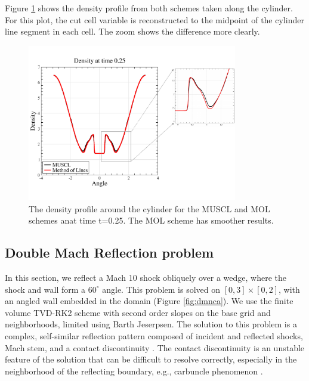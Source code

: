 Figure \ref{fig:cylbndry}
shows the density profile from both schemes
taken along the cylinder.
For this plot, the cut cell variable is
reconstructed to the midpoint of the cylinder line segment in each  cell.  
The zoom shows the difference more
clearly.

\begin{figure}
\begin{center}
\hspace*{-.5in}
\includegraphics[height=2.7in]{figs/MM_densityBndry.pdf}
\hspace*{.3in}
\caption{\sf The density profile  around the cylinder for the MUSCL and MOL schemes anat time
t=0.25.  The MOL scheme has smoother results.}
\label{fig:cylbndry}
\end{center}
\end{figure}

\clearpage

\subsection{Double Mach Reflection problem}
In this section, we reflect a Mach 10 shock obliquely over a wedge, where the shock and wall form a $60^{\circ}$ angle.  
This problem is solved on $[0,3]\times[0,2]$, with an angled wall embedded in the domain (Figure \ref{fig:dmnca}).  
We use the finite volume TVD-RK2 scheme with second order slopes on the base grid and neighborhoods, limited using Barth Jeserpsen.
The solution to this problem is a complex, self-similar reflection pattern composed of incident and reflected shocks, Mach stem, and a contact discontinuity \cite{WOODWARD1984115}.  
The contact discontinuity is an unstable feature of the solution that can be difficult to resolve correctly, especially in the neighborhood of the reflecting boundary, e.g., carbuncle phenomenon \cite{KEMM2018596}.


